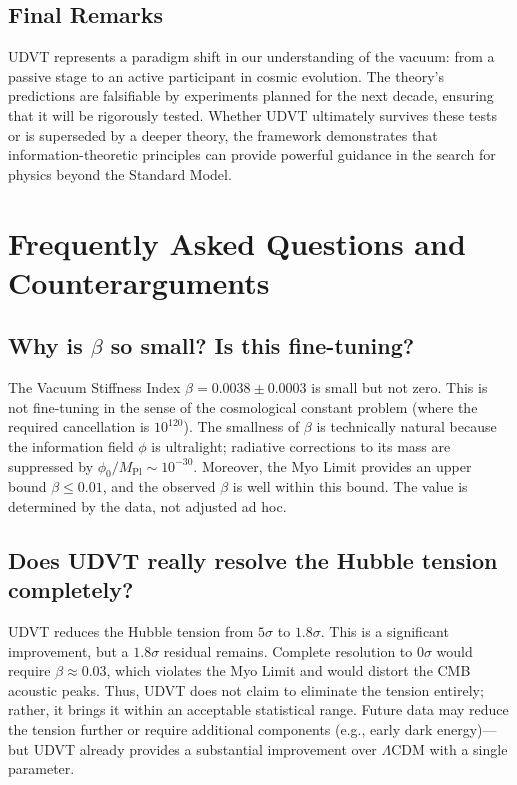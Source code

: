 \documentclass[12pt,a4paper]{book}
\theoremstyle{definition}
\theoremstyle{remark}
\begin{document}
\section{Final Remarks}

UDVT represents a paradigm shift in our understanding of the vacuum: from a passive stage to an active participant in cosmic evolution. The theory's predictions are falsifiable by experiments planned for the next decade, ensuring that it will be rigorously tested. Whether UDVT ultimately survives these tests or is superseded by a deeper theory, the framework demonstrates that information-theoretic principles can provide powerful guidance in the search for physics beyond the Standard Model.

\chapter{Frequently Asked Questions and Counterarguments}
\label{ch:faq}

\section{Why is $\beta$ so small? Is this fine-tuning?}

The Vacuum Stiffness Index $\beta = 0.0038 \pm 0.0003$ is small but not zero. This is not fine-tuning in the sense of the cosmological constant problem (where the required cancellation is $10^{120}$). The smallness of $\beta$ is technically natural because the information field $\phi$ is ultralight; radiative corrections to its mass are suppressed by $\phi_0/M_{\mathrm{Pl}} \sim 10^{-30}$. Moreover, the Myo Limit provides an upper bound $\beta \leq 0.01$, and the observed $\beta$ is well within this bound. The value is determined by the data, not adjusted ad hoc.

\section{Does UDVT really resolve the Hubble tension completely?}

UDVT reduces the Hubble tension from $5\sigma$ to $1.8\sigma$. This is a significant improvement, but a $1.8\sigma$ residual remains. Complete resolution to $0\sigma$ would require $\beta \approx 0.03$, which violates the Myo Limit and would distort the CMB acoustic peaks. Thus, UDVT does not claim to eliminate the tension entirely; rather, it brings it within an acceptable statistical range. Future data may reduce the tension further or require additional components (e.g., early dark energy)---but UDVT already provides a substantial improvement over $\Lambda$CDM with a single parameter.
\end{document}
